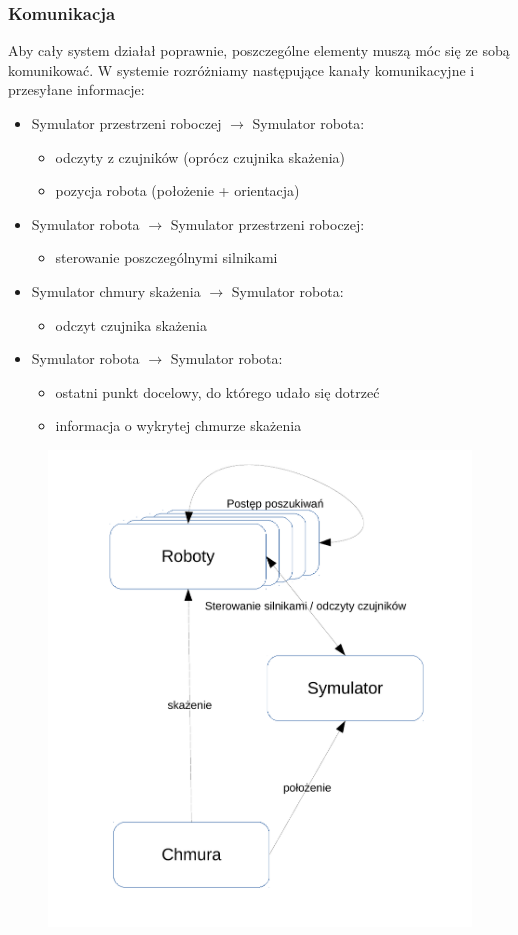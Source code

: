 \documentclass[a4paper, 12pt]{article}
\begin{document}
	\subsubsection{Komunikacja}
	Aby cały system działał poprawnie, poszczególne elementy muszą móc się ze sobą komunikować. W systemie rozróżniamy następujące kanały komunikacyjne i przesyłane informacje:
	\begin{itemize}
	\item Symulator przestrzeni roboczej $\rightarrow$ Symulator robota:
		\begin{itemize}
		\item odczyty z czujników (oprócz czujnika skażenia)
		\item pozycja robota (położenie + orientacja)	
		\end{itemize}
	\item Symulator robota $\rightarrow$ Symulator przestrzeni roboczej:
		\begin{itemize}
		\item sterowanie poszczególnymi silnikami
		\end{itemize}
	\item Symulator chmury skażenia $\rightarrow$ Symulator robota:
		\begin{itemize}
		\item odczyt czujnika skażenia
		\end{itemize}
	\item Symulator robota $\rightarrow$ Symulator robota:
		\begin{itemize}
		\item ostatni punkt docelowy, do którego udało się dotrzeć
		\item informacja o wykrytej chmurze skażenia
		\end{itemize}
	
	\end{itemize}
	
	\begin{figure}[h!]
	\centering
	\includegraphics[width=0.6\columnwidth]{img/system.pdf}
	\end{figure}
	
\end{document}
